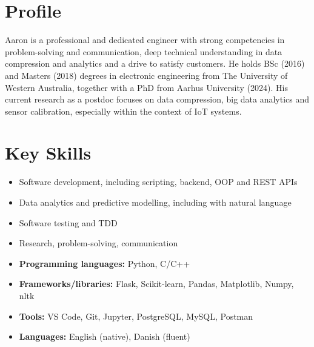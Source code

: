 \documentclass[a4paper,11pt]{article}
\begin{document}






\section{Profile}\vspace{-0.3em}

\noindent
Aaron is a professional and dedicated engineer with strong competencies in problem-solving and communication, deep technical understanding in data compression and analytics and a drive to satisfy customers.
He holds BSc (2016) and Masters (2018) degrees in electronic engineering from The University of Western Australia, together with a PhD from Aarhus University (2024).
His current research as a postdoc focuses on data compression, big data analytics and sensor calibration, especially within the context of IoT systems.




\section{Key Skills}\vspace{-1.3em}

\begin{multicols}{2}
    \begin{itemize}[topsep=0pt,itemsep=-0.3em]
        \item Software development, including scripting, backend, OOP and REST APIs
        \item Data analytics and predictive modelling, including with natural language
        \item Software testing and TDD
        \item Research, problem-solving, communication

        \item \textbf{Programming languages:} Python, C/C++
        \item \textbf{Frameworks/libraries:} Flask, Scikit-learn, Pandas, Matplotlib, Numpy, nltk
        \item \textbf{Tools:} VS Code, Git, Jupyter, PostgreSQL, MySQL, Postman
        \item \textbf{Languages:} English (native), Danish (fluent)
    \end{itemize}
\end{multicols}
\vspace{-0.7em}
\end{document}
